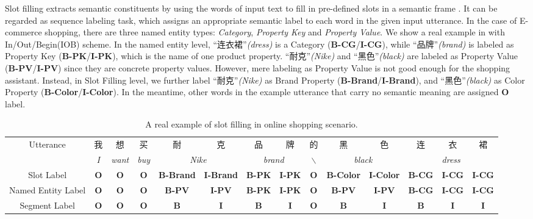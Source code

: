 Slot filling extracts semantic constituents
by using the words of input text to fill in pre-defined slots in 
a semantic frame \cite{mesnil2015using}.
It can be regarded as sequence labeling task,
which assigns an appropriate semantic label to each word in
the given input utterance. 
In the case of E-commerce shopping, 
there are three named entity types: 
\emph{Category}, \emph{Property Key} and \emph{Property Value}.
We show a real example in 
with In/Out/Begin(IOB) scheme.
In the named entity level,
``连衣裙''\emph{(dress)} is a Category (\textbf{B-CG}/\textbf{I-CG}),
while ``品牌''\emph{(brand)} is labeled as Property Key
(\textbf{B-PK}/\textbf{I-PK}),
which is the name of one product property.
``耐克''\emph{(Nike)} and ``黑色''\emph{(black)} are labeled as Property Value
(\textbf{B-PV}/\textbf{I-PV}) since they are concrete property values.
However, mere labeling as Property Value is not good enough for the shopping
assistant.
Instead, in Slot Filling level, 
we further label ``耐克''\emph{(Nike)} as Brand Property (\textbf{B-Brand}/\textbf{I-Brand}), 
and ``黑色''\emph{(black)} as 
Color Property (\textbf{B-Color}/\textbf{I-Color}).
In the meantime, other words in the example utterance that carry 
no semantic meaning are assigned \textbf{O} label.
\begin{table*}[h]
	\centering
	\small
	\caption{A real example of slot filling in online shopping scenario.}
	\begin{tabular}{c|c|c|c|c|c|c|c|c|c|c|c|c|c}
		\toprule
		\multirow{2}{*}{Utterance} & 我 & 想 & 买 & 耐 & 克 & 品 & 牌 & 的 & 黑 & 色 & 连 & 衣 & 裙 \\
		\cmidrule{2-14}
		& \em{I} & \em{want} & \em{buy} & \multicolumn{2}{c|}{\em{Nike}} & \multicolumn{2}{c|}{\em{brand}} & $\backslash$  & \multicolumn{2}{c|}{\em{black}} & \multicolumn{3}{c}{\em{dress}} \\
		\midrule
		Slot Label & \textbf{O} & \textbf{O} & \textbf{O} & \textbf{B-Brand} & \textbf{I-Brand} & \textbf{B-PK} & \textbf{I-PK} & \textbf{O} & \textbf{B-Color} & \textbf{I-Color} & \textbf{B-CG} & \textbf{I-CG} & \textbf{I-CG} \\
		\midrule
		Named Entity Label & \textbf{O} & \textbf{O} & \textbf{O} & \textbf{B-PV} & \textbf{I-PV} & \textbf{B-PK} & \textbf{I-PK} & \textbf{O} & \textbf{B-PV} & \textbf{I-PV} & \textbf{B-CG} & \textbf{I-CG} & \textbf{I-CG} \\
		\midrule
		Segment Label & \textbf{O} & \textbf{O} & \textbf{O} & \textbf{B} & \textbf{I} & \textbf{B} & \textbf{I} & \textbf{O} & \textbf{B} & \textbf{I} & \textbf{B} & \textbf{I} & \textbf{I} \\
		\bottomrule
	\end{tabular}
	\label{tab:slot-filling-demo}
\end{table*}

